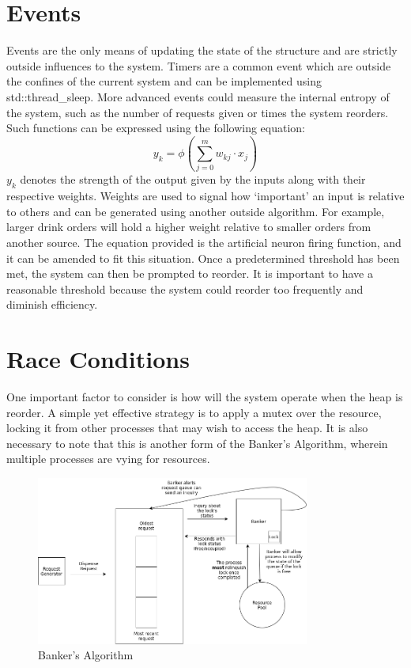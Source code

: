 \documentclass{article}
\begin{document}
\newpage

\section{Events}

Events are the only means of updating the state of the structure and are strictly outside influences to the system.
Timers are a common event which are outside the confines of the current system and can be implemented using std::thread_sleep.
More advanced events could measure the internal entropy of the system, such as the number of requests given or times the system reorders.
Such functions can be expressed using the following equation:
\[ 
		y_{k} = \phi \left( \sum_{j=0}^{m}w_{kj} \cdot x_{j} \right)
\]
$y_{k}$ denotes the strength of the output given by the inputs along with their respective weights.
Weights are used to signal how `important' an input is relative to others and can be generated using another outside algorithm.
For example, larger drink orders will hold a higher weight relative to smaller orders from another source.
The equation provided is the artificial neuron firing function, and it can be amended to fit this situation.
Once a predetermined threshold has been met, the system can then be prompted to reorder.
It is important to have a reasonable threshold because the system could reorder too frequently and diminish efficiency.

\section{Race Conditions}

One important factor to consider is how will the system operate when the heap is reorder.
A simple yet effective strategy is to apply a mutex over the resource, locking it from other processes that may wish to access the heap.
It is also necessary to note that this is another form of the Banker's Algorithm, wherein multiple processes are vying for resources.

\begin{figure}[!h]
\centering
\includegraphics[width=9cm]{BankersAlgorithm}
\caption{Banker's Algorithm}
\end{figure}
\end{document}
